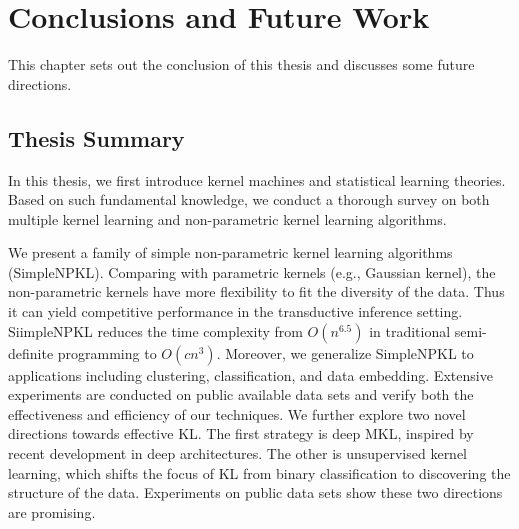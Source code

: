 \chapter{Conclusions and Future Work} \label{chp:conclusion}

This chapter sets out the conclusion of this thesis and discusses some future directions.

\section{Thesis Summary}


In this thesis, we first introduce kernel machines and statistical learning theories. Based on such fundamental knowledge, we conduct a thorough survey on both multiple kernel learning and non-parametric kernel learning algorithms.

We present a family of simple non-parametric kernel learning algorithms (SimpleNPKL). Comparing with parametric kernels (e.g., Gaussian kernel), the non-parametric kernels have more flexibility to fit the diversity of the data. Thus it can yield competitive performance in the transductive inference setting. SiimpleNPKL reduces the time complexity from $O(n^{6.5})$ in traditional semi-definite programming to $O(cn^3)$. Moreover, we generalize SimpleNPKL to applications including clustering, classification, and data embedding. Extensive experiments are conducted on public available data sets and verify both the effectiveness and efficiency of our techniques.  We further explore two novel directions towards effective KL. The first strategy is deep MKL, inspired by recent development in deep architectures. The other is unsupervised kernel learning, which shifts the focus of KL from binary classification to discovering the structure of the data. Experiments on public data sets show these two directions are promising.

